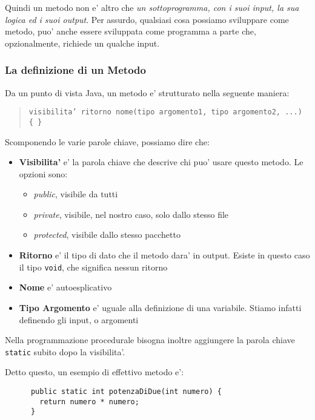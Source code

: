 \documentclass{article}
\begin{document}
{    Quindi un metodo non e' altro che \textit{un sottoprogramma, con i suoi input, la sua logica ed i suoi output}. Per assurdo, qualsiasi cosa possiamo sviluppare come metodo, puo' anche essere sviluppata come programma a parte che, opzionalmente, richiede un qualche input.

    \subsubsection{La definizione di un Metodo}
    Da un punto di vista Java, un metodo e' strutturato nella seguente maniera:

    \begin{quote}
      \texttt{visibilita' ritorno nome(tipo argomento1, tipo argomento2, ...) \{ \}}
    \end{quote}

    Scomponendo le varie parole chiave, possiamo dire che:

    \begin{itemize}
      \item \textbf{Visibilita'} e' la parola chiave che descrive chi puo' usare questo metodo. Le opzioni sono:
      \begin{itemize}
        \item \textit{public}, visibile da tutti
        \item \textit{private}, visibile, nel nostro caso, solo dallo stesso file
        \item \textit{protected}, visibile dallo stesso pacchetto
      \end{itemize}
      \item \textbf{Ritorno} e' il tipo di dato che il metodo dara' in output. Esiste in questo caso il tipo \texttt{void}, che significa nessun ritorno
      \item \textbf{Nome} e' autoesplicativo
      \item \textbf{Tipo Argomento} e' uguale alla definizione di una variabile. Stiamo infatti definendo gli input, o argomenti
    \end{itemize}

    Nella programmazione procedurale bisogna inoltre aggiungere la parola chiave \texttt{static} subito dopo la visibilita'.

    Detto questo, un esempio di effettivo metodo e':

    \begin{verbatim}
      public static int potenzaDiDue(int numero) {
        return numero * numero;
      }
    \end{verbatim}

}
\end{document}
